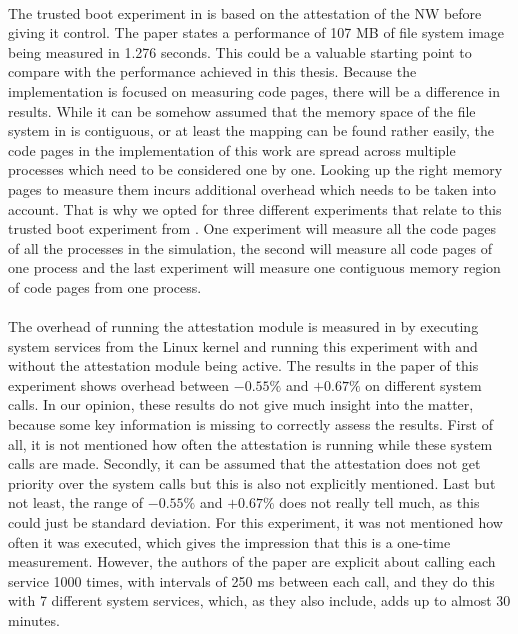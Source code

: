 \paragraph*{}
The trusted boot experiment in \cite{LingZhen2021Sbtb} is based on the attestation of the NW before giving it control. The paper states a performance of 107 MB of file system image being measured in 1.276 seconds. This could be a valuable starting point to compare with the performance achieved in this thesis. Because the implementation is focused on measuring code pages, there will be a difference in results. While it can be somehow assumed that the memory space of the file system in \cite{LingZhen2021Sbtb} is contiguous, or at least the mapping can be found rather easily, the code pages in the implementation of this work are spread across multiple processes which need to be considered one by one. Looking up the right memory pages to measure them incurs additional overhead which needs to be taken into account. That is why we opted for three different experiments that relate to this trusted boot experiment from \cite{LingZhen2021Sbtb}. One experiment will measure all the code pages of all the processes in the simulation, the second will measure all code pages of one process and the last experiment will measure one contiguous memory region of code pages from one process.

\paragraph*{}
The overhead of running the attestation module is measured in \cite{LingZhen2021Sbtb} by executing system services from the Linux kernel and running this experiment with and without the attestation module being active. The results in the paper of this experiment shows overhead between $- 0.55 \%$ and $+ 0.67 \%$ on different system calls. In our opinion, these results do not give much insight into the matter, because some key information is missing to correctly assess the results. First of all, it is not mentioned how often the attestation is running while these system calls are made. Secondly, it can be assumed that the attestation does not get priority over the system calls but this is also not explicitly mentioned. Last but not least, the range of $- 0.55 \%$ and $+ 0.67 \%$ does not really tell much, as this could just be standard deviation. For this experiment, it was not mentioned how often it was executed, which gives the impression that this is a one-time measurement. However, the authors of the paper are explicit about calling each service 1000 times, with intervals of 250 ms between each call, and they do this with 7 different system services, which, as they also include, adds up to almost 30 minutes.

